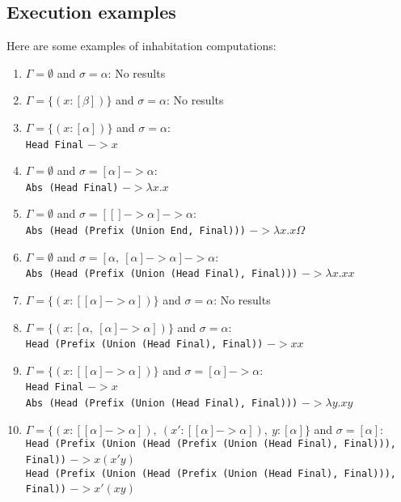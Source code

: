 \documentclass{article}
\begin{document}
\subsection{Execution examples}
Here are some examples of inhabitation computations:


\begin{enumerate}
    \item $\Gamma = \emptyset$ and $\sigma = \alpha$: No results
    \item $\Gamma = \{(x:[\beta])\}$ and $\sigma = \alpha$: No results
    \item $\Gamma = \{(x:[\alpha])\}$ and $\sigma = \alpha$:\\
        \qquad\texttt{Head Final} $->x$ 
 
    \item $\Gamma = \emptyset$ and $\sigma = [\alpha] -> \alpha$:\\
        \qquad \texttt{Abs (Head Final)} $->\lambda x.x$ 
    
    \item $\Gamma = \emptyset$ and $\sigma = [[] -> \alpha] -> \alpha$:\\
        \qquad \texttt{Abs (Head (Prefix (Union End, Final)))}  $->\lambda x.x\Omega$
    
    \item $\Gamma = \emptyset$ and $\sigma = [\alpha,\ [\alpha] -> \alpha] -> \alpha$: \\
        \qquad \texttt{Abs (Head (Prefix (Union (Head Final), Final)))}  $->\lambda x.xx$
    
    \item $\Gamma = \{(x:[[\alpha] -> \alpha])\}$ and $\sigma = \alpha$: No results 
    
    \item $\Gamma = \{(x:[\alpha,\ [\alpha] -> \alpha])\}$ and $\sigma = \alpha$: \\
        \qquad \texttt{Head (Prefix (Union (Head Final), Final))}  $->xx$ 
    
    \item $\Gamma = \{(x:[[\alpha] -> \alpha])\}$ and $\sigma = [\alpha] -> \alpha$: \\
        \qquad \texttt{Head Final} $->x$\\
        \qquad \texttt{Abs (Head (Prefix (Union (Head Final), Final)))} $->\lambda y.xy$
    
    \item $\Gamma = \{(x:[[\alpha] -> \alpha]),\ (x':[[\alpha] -> \alpha]),\ y:[\alpha]\}$ and $\sigma = [\alpha]$:\\
        \qquad \texttt{Head (Prefix (Union (Head (Prefix (Union (Head Final), Final))), Final))} $-> x(x'y)$\\
        \qquad \texttt{Head (Prefix (Union (Head (Prefix (Union (Head Final), Final))), Final))} $-> x'(xy)$\\
        

\end{enumerate}
\end{document}
